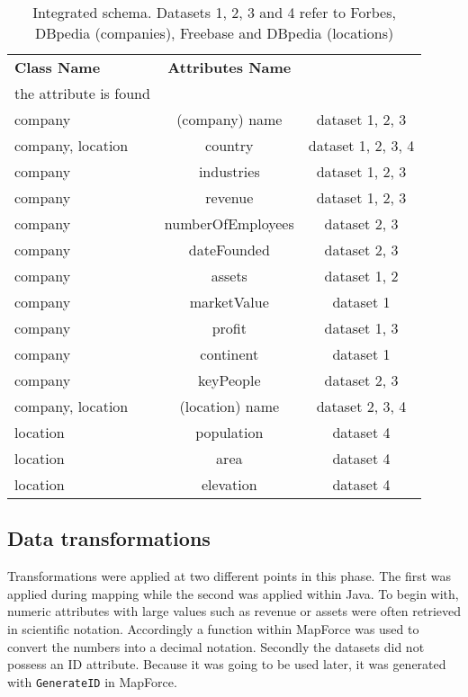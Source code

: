 
\begin{table}[H]
\centering
\begin{tabularx}{\linewidth}{|X|c|c|}
\hline
\textbf{Class Name} & \textbf{Attributes Name} & \textbf{\begin{tabular}[c]{@{}c@{}}Datasets in which\\ the attribute is found\end{tabular}} \\ \hline
company & (company) name & dataset 1, 2, 3 \\ \hline
company, location & country & dataset 1, 2, 3, 4 \\ \hline
company & industries & dataset 1, 2, 3 \\ \hline
company & revenue & dataset 1, 2, 3 \\ \hline
company & numberOfEmployees & dataset 2, 3 \\ \hline
company & dateFounded & dataset 2, 3 \\ \hline
company & assets & dataset 1, 2 \\ \hline
company & marketValue & dataset 1 \\ \hline
company & profit & dataset 1, 3 \\ \hline
company & continent & dataset 1 \\ \hline
company & keyPeople & dataset 2, 3 \\ \hline
company, location & (location) name & dataset 2, 3, 4 \\ \hline
location & population & dataset 4 \\ \hline
location & area & dataset 4 \\ \hline
location & elevation & dataset 4 \\ \hline
\end{tabularx}
\caption[Integrated schema]{Integrated schema. Datasets 1, 2, 3 and 4 refer to Forbes, DBpedia (companies), Freebase and DBpedia (locations)}
\label{my-label}
\end{table}





\subsection{Data transformations}
Transformations were applied at two different points in this phase. The first was applied during mapping while the second was applied within Java. To begin with, numeric attributes with large values such as revenue or assets were often retrieved in scientific notation. Accordingly a function within MapForce was used to convert the numbers into a decimal notation. Secondly the datasets did not possess an ID attribute. Because it was going to be used later, it was generated with \texttt{GenerateID} in MapForce. 

